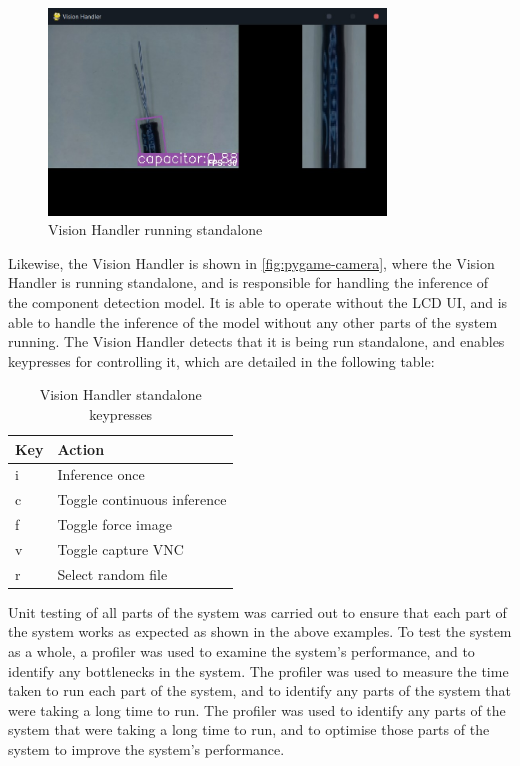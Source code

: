 \begin{figure}[H]
  \centering
  \includegraphics[width=0.8\textwidth]{imgs/software/visionhandler.jpg}
  \caption{Vision Handler running standalone}
  \label{fig:pygame-camera}
\end{figure}

Likewise, the Vision Handler is shown in \autoref{fig:pygame-camera}, where the Vision Handler is running standalone, and is responsible for handling the inference of the component detection model. It is able to operate without the LCD UI, and is able to handle the inference of the model without any other parts of the system running. The Vision Handler detects that it is being run standalone, and enables keypresses for controlling it, which are detailed in the following table:

\begin{table}[H]
  \centering
  \begin{tabularx}{\textwidth}{|X|X|}
    \hline
    \textbf{Key} & \textbf{Action} \\
    \hline
    i & Inference once \\
    \hline
    c & Toggle continuous inference \\
    \hline
    f & Toggle force image \\
    \hline
    v & Toggle capture VNC \\
    \hline
    r & Select random file \\
    \hline
  \end{tabularx}
  \caption{Vision Handler standalone keypresses}
  \label{tab:vision-handler-keypresses}
\end{table}

Unit testing of all parts of the system was carried out to ensure that each part of the system works as expected as shown in the above examples. To test the system as a whole, a profiler was used to examine the system's performance, and to identify any bottlenecks in the system. The profiler was used to measure the time taken to run each part of the system, and to identify any parts of the system that were taking a long time to run. The profiler was used to identify any parts of the system that were taking a long time to run, and to optimise those parts of the system to improve the system's performance.



